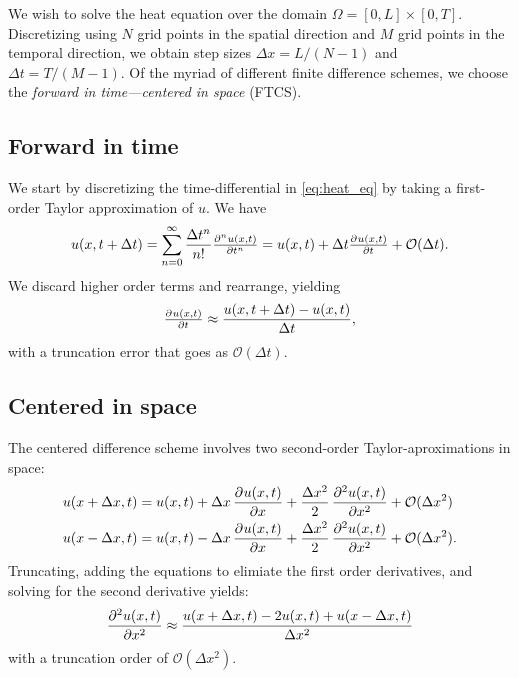 \documentclass[article, a4paper, oneside]{memoir}
\begin{document}
	We wish to solve the heat equation over the domain \( \Omega = [0, L]
	\times [0, T]  \). Discretizing using \( N \) grid points in the
	spatial direction and \( M \) grid points in the temporal direction, we
	obtain step sizes \( \Delta x = L / (N - 1) \) and \( \Delta t = T / (M
	- 1) \). Of the myriad of different finite difference schemes, we
	choose the \emph{forward in time---centered in space} (FTCS).
	
	\subsection{Forward in time}
	We start by discretizing the time-differential in \cref{eq:heat_eq} by
	taking a first-order Taylor approximation of \( u \). We have
	\begin{equation}
		u(x, t + \Delta t) = \sum_{n = 0}^\infty \frac{\Delta t^n}{n!} \pd[n]{u(x, t)}{t} = u(x, t) + \Delta t \pd{u(x, t)}{t} + \mathcal{O}(\Delta t).
	\end{equation}
	We discard higher order terms and rearrange, yielding
	\begin{equation}
		\label{eq:forward_time}
		\pd{u(x, t)}{t} \approx \frac{u(x, t+\Delta t) - u(x, t)}{\Delta t}, 
	\end{equation}
	with a truncation error that goes as \( \mathcal{O}(\Delta t) \).
	
	\subsection{Centered in space}	

	The centered difference scheme involves two second-order
	Taylor-aproximations in space:
	\begin{align}
		u(x + \Delta x, t) &= u(x, t) + \Delta x \dpd{u(x, t)}{x} +
		\frac{\Delta x^2}{2} \dpd[2]{u(x, t)}{x} + \mathcal{O}(\Delta x^2) \\
		u(x - \Delta x, t) &= u(x, t) - \Delta x \dpd{u(x, t)}{x} + \frac{\Delta x^2}{2} \dpd[2]{u(x, t)}{x} + \mathcal{O}(\Delta x^2).
	\end{align}
	Truncating, adding the equations to elimiate the first order
	derivatives, and solving for the second derivative yields:
	\begin{equation}
		\label{eq:centered_space}
		\dpd[2]{u(x, t)}{x} \approx \frac{u(x + \Delta x, t) - 2 u(x,
		t) + u(x - \Delta x, t)}{\Delta x^2}
	\end{equation}
	with a truncation order of \( \mathcal{O}(\Delta x^2) \).
\end{document}
